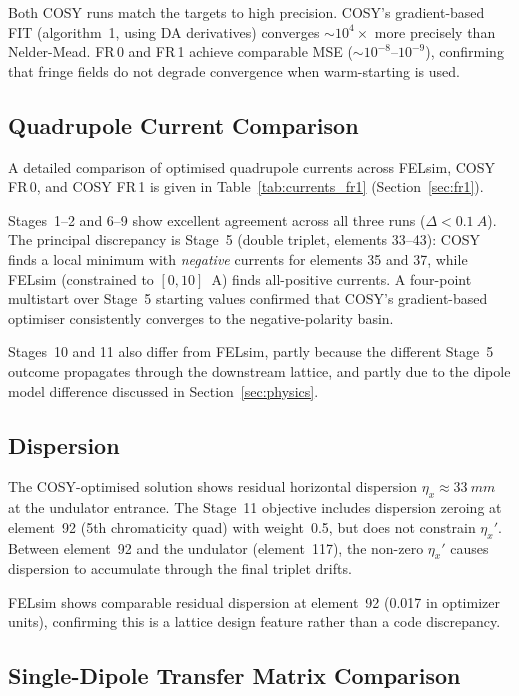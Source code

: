 \documentclass[11pt]{article}
\begin{document}
Both COSY runs match the targets to high precision. COSY's gradient-based
FIT (algorithm~1, using DA derivatives) converges $\sim 10^4\times$
more precisely than Nelder-Mead. FR\,0 and FR\,1 achieve comparable
MSE ($\sim 10^{-8}$--$10^{-9}$), confirming that fringe fields do not
degrade convergence when warm-starting is used.


\subsection{Quadrupole Current Comparison}

A detailed comparison of optimised quadrupole currents across FELsim,
COSY FR\,0, and COSY FR\,1 is given in Table~\ref{tab:currents_fr1}
(Section~\ref{sec:fr1}).

Stages~1--2 and 6--9 show excellent agreement across all three runs
($\Delta < \SI{0.1}{A}$). The principal discrepancy is Stage~5 (double
triplet, elements 33--43): COSY finds a local minimum with
\emph{negative} currents for elements 35 and 37, while FELsim
(constrained to $[0, 10]$~A) finds all-positive currents. A four-point
multistart over Stage~5 starting values confirmed that COSY's
gradient-based optimiser consistently converges to the negative-polarity
basin.

Stages~10 and 11 also differ from FELsim, partly because the different
Stage~5 outcome propagates through the downstream lattice, and partly
due to the dipole model difference discussed in Section~\ref{sec:physics}.


\subsection{Dispersion}

The COSY-optimised solution shows residual horizontal dispersion
$\eta_x \approx \SI{33}{mm}$ at the undulator entrance.
The Stage~11 objective includes dispersion zeroing at element~92
(5th chromaticity quad) with weight~0.5, but does not constrain
$\eta_x'$. Between element~92 and the undulator (element~117),
the non-zero $\eta_x'$ causes dispersion to accumulate through
the final triplet drifts.

FELsim shows comparable residual dispersion at element~92
(0.017 in optimizer units), confirming this is a lattice design
feature rather than a code discrepancy.


\subsection{Single-Dipole Transfer Matrix Comparison}
\label{sec:sandwich}
\end{document}
